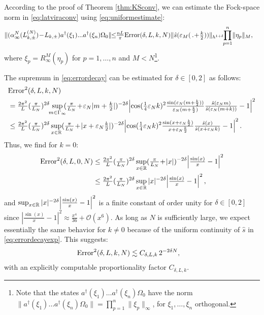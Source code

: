 \documentclass[a4paper, 11pt]{article}
\DeclareMathOperator{\1}{\mathds{1}}
\begin{document}
\medskip

According to the proof of Theorem \ref{thm:KSconv}, we can estimate the Fock-space norm in \eqref{eq:latviraconv} using \eqref{eq:uniformestimate}:
\begin{align}
\label{eq:uniformestimateFock}
\|(\alpha^{N}_{\infty}(L^{(N)}_{k,\pm})\!-\!L_{k,\pm})a^{\dagger}(\xi_{1})...a^{\dagger}(\xi_{n})\Omega_{0}\| & \!\!\leq\!\!\tfrac{nL}{\pi}\textup{Error}(\delta,L, k, N)\|\hat{s}(\vep_{M}(\!\ .\!\ \!\!+\!\tfrac{k}{2}))\|_{h^{1+\delta}}\!\!\prod_{p=1}^{n}\!\|\eta_{p}\|_{M},
\end{align}
where $\xi_{p} = R^{M}_{\infty}(\eta_{p})$ for $p=1,\dots,n$ and $M<N$\footnote{Note that the states $a^{\dagger}(\xi_{1})\dots a^{\dagger}(\xi_{n})\Omega_{0}$ have the norm $\|a^{\dagger}(\xi_{1})\dots a^{\dagger}(\xi_{n})\Omega_{0}\| = \prod_{p=1}^{n}\|\xi_{p}\|_{\infty}$, for $\xi_{1},\dots,\xi_{n}$ orthogonal.}.

\medskip

The supremum in \eqref{eq:errordecay} can be estimated for $\delta\in[0,2]$ as follows:
\begin{align}
\label{eq:errordecayexp}
& \textup{Error}^{2}(\delta,L, k, N) \\ \nonumber
& = \tfrac{2\pi^2}{L}(\tfrac{\pi}{L_{N}})^{2\delta}\!\!\sup_{m\in\Gamma_{\infty}}\!\!(\tfrac{\pi}{L_{N}}\!+\!\vep_{N}|m+\tfrac{k}{2}|)^{-2\delta}\!\left| \cos(\tfrac{1}{4}\vep_{N}k)^{2}\tfrac{\sin(\vep_{N}(m+\frac{k}{2}))}{\vep_{N}(m+\frac{k}{2})}\tfrac{\hat{s}(\vep_{N}m)}{\hat{s}(\vep_{N}(m+k))}-1\right|^{2} \\ \nonumber
& \leq \tfrac{2\pi^2}{L}(\tfrac{\pi}{L_{N}})^{2\delta}\sup_{x\in\R}(\tfrac{\pi}{L_{N}}\!+\!|x+\vep_{N}\tfrac{k}{2}|)^{-2\delta}\!\left| \cos(\tfrac{1}{4}\vep_{N}k)^{2}\tfrac{\sin(x+\vep_{N}\frac{k}{2})}{x+\vep_{N}\frac{k}{2}}\tfrac{\hat{s}(x)}{\hat{s}(x+\vep_{N}k)}-1\right|^{2}.
\end{align}
Thus, we find for $k=0$:
\begin{align}
\label{eq:errordecayexp0}
\textup{Error}^{2}(\delta,L, 0, N) & \leq \tfrac{2\pi^2}{L}(\tfrac{\pi}{L_{N}})^{2\delta}\sup_{x\in\mathbb{R}}(\tfrac{\pi}{L_{N}}\!+\!|x|)^{-2\delta}\!\left|\tfrac{\sin(x)}{x}-1\right|^{2} \\ \nonumber
 & \leq \tfrac{2\pi^2}{L}(\tfrac{\pi}{L_{N}})^{2\delta}\sup_{x\in\mathbb{R}}|x|^{-2\delta}\!\left|\tfrac{\sin(x)}{x}-1\right|^{2},
\end{align}
and $\sup_{x\in\mathbb{R}}|x|^{-2\delta}\!\left|\tfrac{\sin(x)}{x}-1\right|^{2}$ is a finite constant of order unity for $\delta\in[0,2]$ since $|\tfrac{\sin(x)}{x}-1|^{2}\approx\tfrac{x^{4}}{36}+\mathcal{O}(x^{6})$. As long as $N$ is sufficiently large, we expect essentially the same behavior for $k\neq 0$ because of the uniform continuity of $\hat{s}$ in \eqref{eq:errordecayexp}. This suggests:
\begin{align}
\label{eq:errorscaling}
\textup{Error}^{2}(\delta,L, k, N) & \lesssim C_{\delta,L,k}\!\ 2^{-2\delta N},
\end{align}
with an explicitly computable proportionality factor $C_{\delta,L,k}$.
\end{document}
